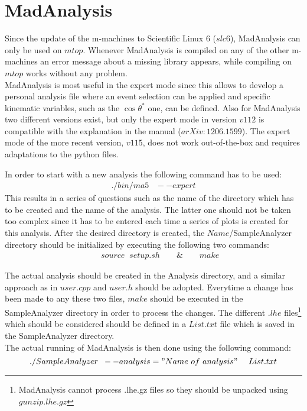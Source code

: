 \section{MadAnalysis}
Since the update of the m-machines to Scientific Linux 6 ($slc6$), MadAnalysis can only be used on $mtop$. Whenever MadAnalysis is compiled on any of the other m-machines an error message about a missing library appears, while compiling on $mtop$ works without any problem.\\

MadAnalysis is most useful in the expert mode since this allows to develop a personal analysis file where an event selection can be applied and specific kinematic variables, such as the $\cos \theta^{*}$ one, can be defined. Also for MadAnalysis two different versions exist, but only the expert mode in version $v112$ is compatible with the explanation in the manual ($arXiv: 1206.1599$). The expert mode of the more recent version, $v115$, does not work out-of-the-box and requires adaptations to the python files.

In order to start with a new analysis the following command has to be used:
\begin{eqnarray}
  ./bin/ma5 \; \; \; --expert \nonumber
\end{eqnarray}
This results in a series of questions such as the name of the directory which has to be created and the name of the analysis.
The latter one should not be taken too complex since it has to be entered each time a series of plots is created for this analysis.
After the desired directory is created, the $Name$/SampleAnalyzer directory should be initialized by executing the following two commands:
\begin{eqnarray}
  & & source \; \; setup.sh \qquad \& \qquad make \nonumber
\end{eqnarray}

The actual analysis should be created in the Analysis directory, and a similar approach as in $user.cpp$ and $user.h$ should be adopted.
Everytime a change has been made to any these two files, $make$ should be executed in the SampleAnalyzer directory in order to process the changes.
The different $.lhe$ files\footnote{MadAnalysis cannot process .lhe.gz files so they should be unpacked using $gunzip .lhe.gz$} which should be considered should be defined in a $List.txt$ file which is saved in the SampleAnalyzer directory. \\

The actual running of MadAnalysis is then done using the following command:
\begin{equation}
  ./SampleAnalyzer \; \; --analysis="Name ~ of ~ analysis" ~~~~ List.txt   \nonumber
\end{equation}


